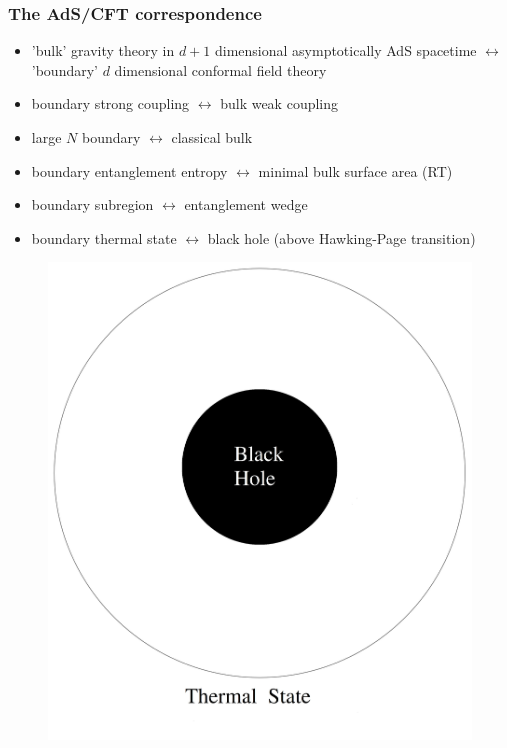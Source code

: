 \documentclass[10pt,aspectratio=169]{beamer}
\begin{document}
\begin{frame}
\frametitle{The AdS/CFT correspondence}

\begin{minipage}[t]{0.48\linewidth}

\begin{itemize}

\item 'bulk' gravity theory in $d+1$ dimensional  asymptotically AdS spacetime $\leftrightarrow$ 'boundary' $d$ dimensional conformal field theory

\item boundary strong coupling $\leftrightarrow$ bulk weak coupling

\item large $N$ boundary $\leftrightarrow$ classical bulk

\item boundary entanglement entropy $\leftrightarrow$ minimal bulk surface area (RT)

\item boundary subregion $\leftrightarrow$ entanglement wedge

\item boundary thermal state $\leftrightarrow$ black hole (above Hawking-Page transition)

\end{itemize}

\end{minipage}
%
\hfill
%
\begin{minipage}[t]{0.48\linewidth}

\begin{figure}
    \begin{center}
    
        \includegraphics[scale=0.06]{adscft6}    
    

\end{center}
\end{figure}
\end{minipage}
\end{frame}
\end{document}
